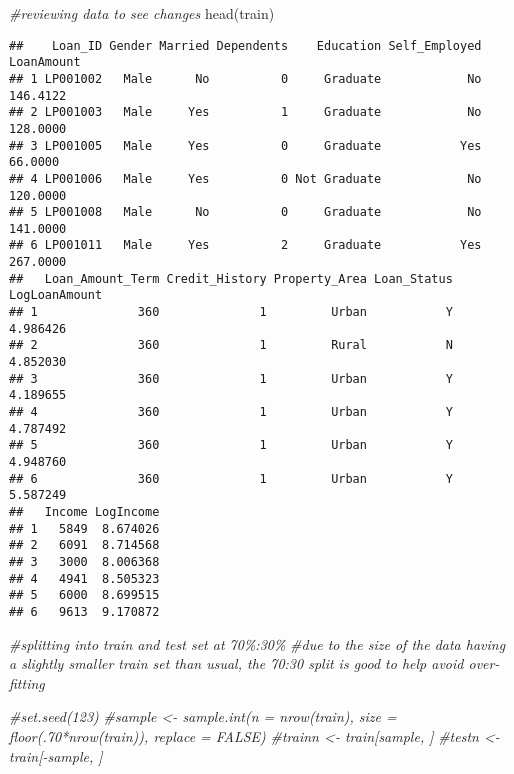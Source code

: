 \documentclass[
]{article}
\newenvironment{Shaded}{\begin{snugshade}}{\end{snugshade}}
\newcommand{\CommentTok}[1]{\textcolor[rgb]{0.56,0.35,0.01}{\textit{#1}}}
\newcommand{\ConstantTok}[1]{\textcolor[rgb]{0.00,0.00,0.00}{#1}}
\newcommand{\FunctionTok}[1]{\textcolor[rgb]{0.00,0.00,0.00}{#1}}
\newcommand{\NormalTok}[1]{#1}
\newcommand{\OtherTok}[1]{\textcolor[rgb]{0.56,0.35,0.01}{#1}}
\newcommand{\SpecialCharTok}[1]{\textcolor[rgb]{0.00,0.00,0.00}{#1}}
\begin{document}
\begin{Shaded}
\begin{Highlighting}[]
\CommentTok{\#reviewing data to see changes}
\FunctionTok{head}\NormalTok{(train)}
\end{Highlighting}
\end{Shaded}

\begin{verbatim}
##    Loan_ID Gender Married Dependents    Education Self_Employed LoanAmount
## 1 LP001002   Male      No          0     Graduate            No   146.4122
## 2 LP001003   Male     Yes          1     Graduate            No   128.0000
## 3 LP001005   Male     Yes          0     Graduate           Yes    66.0000
## 4 LP001006   Male     Yes          0 Not Graduate            No   120.0000
## 5 LP001008   Male      No          0     Graduate            No   141.0000
## 6 LP001011   Male     Yes          2     Graduate           Yes   267.0000
##   Loan_Amount_Term Credit_History Property_Area Loan_Status LogLoanAmount
## 1              360              1         Urban           Y      4.986426
## 2              360              1         Rural           N      4.852030
## 3              360              1         Urban           Y      4.189655
## 4              360              1         Urban           Y      4.787492
## 5              360              1         Urban           Y      4.948760
## 6              360              1         Urban           Y      5.587249
##   Income LogIncome
## 1   5849  8.674026
## 2   6091  8.714568
## 3   3000  8.006368
## 4   4941  8.505323
## 5   6000  8.699515
## 6   9613  9.170872
\end{verbatim}

\begin{Shaded}
\end{Shaded}

\begin{Shaded}
\begin{Highlighting}[]
\CommentTok{\#splitting into train and test set at 70\%:30\%}
\CommentTok{\#due to the size of the data having a slightly smaller train set than usual, the 70:30 split is good to help avoid over{-}fitting}

\CommentTok{\#set.seed(123)}
\CommentTok{\#sample \textless{}{-} sample.int(n = nrow(train), size = floor(.70*nrow(train)), replace = FALSE)}
\CommentTok{\#trainn \textless{}{-} train[sample, ]}
\CommentTok{\#testn  \textless{}{-} train[{-}sample, ]}
\end{Highlighting}
\end{Shaded}
\end{document}
